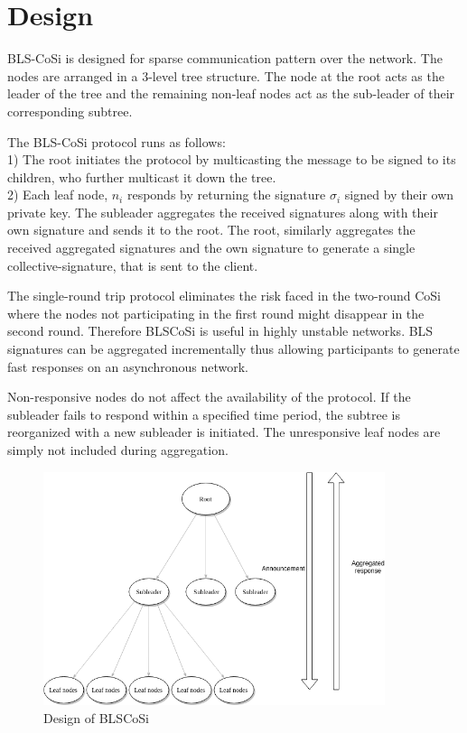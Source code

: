 \section{Design}
\label{design}
BLS-CoSi is designed for sparse communication pattern over the network. The nodes are arranged in a 3-level tree structure. The node at the root acts as the leader of the tree and the remaining non-leaf nodes act as the sub-leader of their corresponding subtree.

The BLS-CoSi protocol runs as follows:\\
1) The root initiates the protocol by multicasting the message to be signed to its children, who further multicast it down the tree.\\
2) Each leaf node, $n_i$ responds by returning the signature $\sigma_i$ signed by their own private key. The subleader aggregates the received signatures along with their own signature and sends it to the root. The root, similarly aggregates the received aggregated signatures and the own signature to generate a single collective-signature, that is sent to the client.

The single-round trip protocol eliminates the risk faced in the two-round CoSi where the nodes not participating in the first round might disappear in the second round. Therefore BLSCoSi is useful in highly unstable networks. BLS signatures can be aggregated incrementally thus allowing participants to generate fast responses on an asynchronous network.

Non-responsive nodes do not affect the availability of the protocol. If the subleader fails to respond within a specified time period, the subtree is reorganized with a new subleader is initiated. The unresponsive leaf nodes are simply not included during aggregation.
\begin{figure}[h]
	\includegraphics[width=10cm]{bls.png}
	\caption{Design of BLSCoSi}
	\label{fig}
\end{figure}
\clearpage